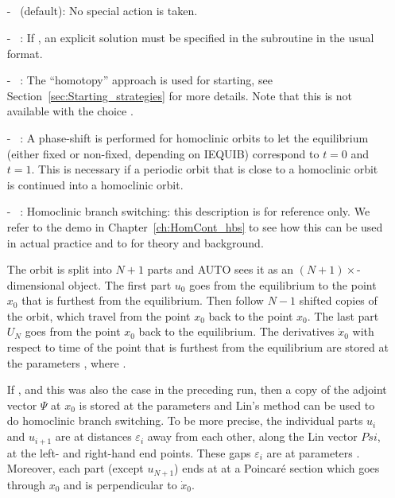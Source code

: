 \documentclass[12pt]{report}
\begin{document}
\subsection{}  \label{sec:ISTART}
\begin{itemize}
\item[-] ~(default):
No special action is taken.
\item[-] ~: 
If , an explicit solution must be specified in the
subroutine  in the usual format. 
\item[-] ~: 
The ``homotopy'' approach is used for starting, see 
Section~\ref{sec:Starting_strategies} 
for more details. Note that this is not available with the choice 
.
\item[-] ~:
A phase-shift is performed for homoclinic orbits to let the
equilibrium (either fixed or non-fixed, depending on IEQUIB)
correspond to $t=0$ and $t=1$. This is necessary if a periodic
orbit that is close to a homoclinic orbit is continued into
a homoclinic orbit.
\item[-] ~:
Homoclinic branch switching: this description is for reference only.
We refer to the demo in Chapter~\ref{ch:HomCont_hbs} to see how this
can be used in actual practice and to  for
theory and background.

The orbit is split into $N+1$ parts and
{\cal AUTO} sees it as an $(N+1)\times$-dimensional object.
The first part $u_0$ goes from the equilibrium to the point $x_0$ that is 
furthest from the equilibrium. 
Then follow $N-1$ shifted copies of the orbit, which travel
from the point $x_0$ back to the point $x_0$. The last part $U_N$
goes from the point $x_0$ back to the equilibrium. 
The derivatives $\dot{x}_0$ with respect to time
of the point that is furthest from the equilibrium are stored at the 
parameters , where .

If , and this was also the case in the preceding run,
then a copy of the adjoint vector $\Psi$ at $x_0$ is stored at the parameters
 and Lin's method can be used
to do homoclinic branch switching. To be more precise, the individual parts
$u_i$ and $u_{i+1}$ are at distances $\varepsilon_i$ away from each
other, along the Lin vector $Psi$, at the left- and right-hand end
points. These gaps $\varepsilon_i$ are at parameters
. Moreover, each part (except $u_{N+1}$) ends at
at a Poincar\'e section which goes through $x_0$ and is perpendicular
to $\dot{x}_0$.


\end{itemize}
\end{document}
